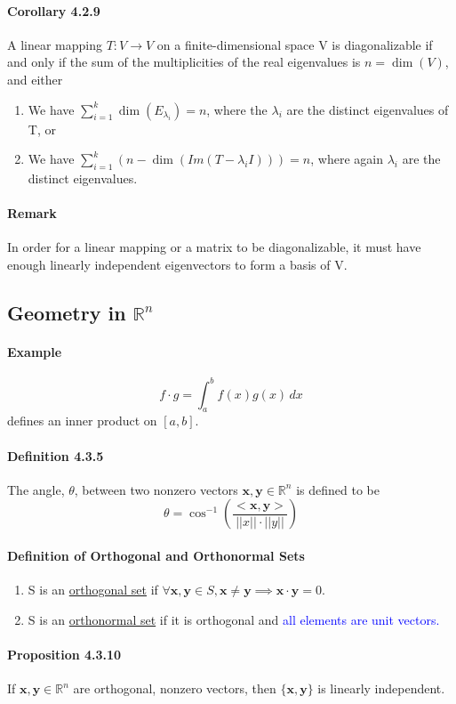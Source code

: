 \documentclass[11pt]{article}
\newcommand{\tb}[1]{\textbf{#1}}
\newcommand{\under}[1]{\underline{#1}}
\newcommand{\real}[0]{\mathbb{R}}
\newcommand{\vx}[0]{\tb{x}}
\newcommand{\vy}[0]{\tb{y}}
\begin{document}
{\paragraph{Corollary 4.2.9} A linear mapping $T: V \rightarrow V$ on a finite-dimensional space V is diagonalizable if and only if the sum of the multiplicities of the real eigenvalues is $n = \dim(V)$, and either
\begin{enumerate}
	\item We have $\sum_{i=1}^k \dim(E_{\lambda_i}) = n$, where the $\lambda_i$ are the distinct eigenvalues of T, or
	\item We have $\sum_{i=1}^k (n - \dim(Im(T - \lambda_iI))) = n$, where again $\lambda_i$ are the distinct eigenvalues. 
\end{enumerate}
\paragraph{Remark}
In order for a linear mapping or a matrix to be diagonalizable, it must have enough linearly independent eigenvectors to form a basis of V.
\subsection{Geometry in $\real^n$}
\paragraph{Example}
$$f\cdot g = \int_a^b f(x)g(x) \, dx$$ defines an inner product on $[a, b]$.
\paragraph{Definition 4.3.5} The angle, $\theta$, between two nonzero vectors $\vx, \vy \in \real^n$ is defined to be 
$$ \theta = \cos^{-1}(\frac{<\vx, \vy>}{||x||\cdot ||y||})$$
\paragraph{Definition of Orthogonal and Orthonormal Sets}
\begin{enumerate}
	\item S is an \under{orthogonal set} if $\forall \vx, \vy \in S, \vx \neq \vy \implies \vx \cdot \vy = 0$.
	\item S is an \under{orthonormal set} if it is orthogonal and \textcolor{blue}{all elements are unit vectors.}
\end{enumerate}

\paragraph{Proposition 4.3.10} If $\vx, \vy \in \real^n$ are orthogonal, nonzero vectors, then $\{ \vx, \vy\}$ is linearly independent.

}
\end{document}
